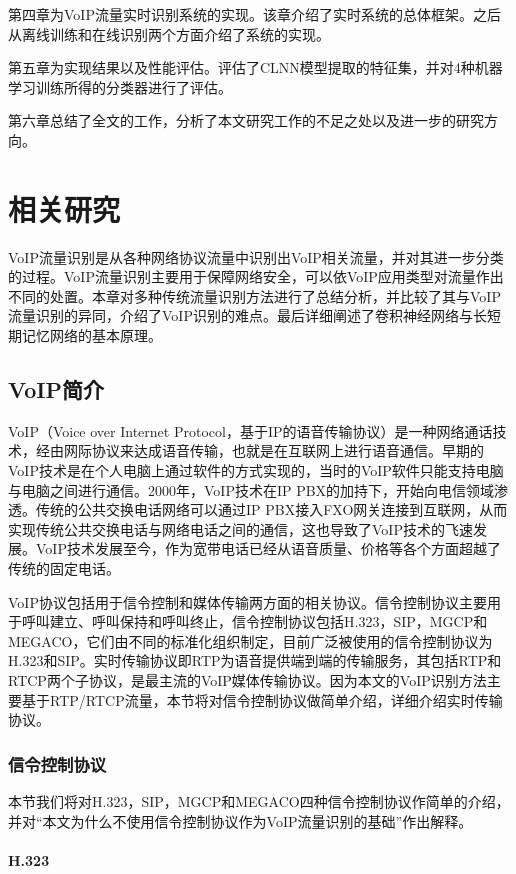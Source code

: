 第四章为VoIP流量实时识别系统的实现。该章介绍了实时系统的总体框架。之后从离线训练和在线识别两个方面介绍了系统的实现。

第五章为实现结果以及性能评估。评估了CLNN模型提取的特征集，并对4种机器学习训练所得的分类器进行了评估。

第六章总结了全文的工作，分析了本文研究工作的不足之处以及进一步的研究方向。


\chapter{相关研究}
VoIP流量识别是从各种网络协议流量中识别出VoIP相关流量，并对其进一步分类的过程。VoIP流量识别主要用于保障网络安全，可以依VoIP应用类型对流量作出不同的处置。本章对多种传统流量识别方法进行了总结分析，并比较了其与VoIP流量识别的异同，介绍了VoIP识别的难点。最后详细阐述了卷积神经网络与长短期记忆网络的基本原理。

\section{VoIP简介}
VoIP（Voice over Internet Protocol，基于IP的语音传输协议）是一种网络通话技术，经由网际协议来达成语音传输，也就是在互联网上进行语音通信。早期的VoIP技术是在个人电脑上通过软件的方式实现的，当时的VoIP软件只能支持电脑与电脑之间进行通信。2000年，VoIP技术在IP PBX的加持下，开始向电信领域渗透。传统的公共交换电话网络可以通过IP PBX接入FXO网关连接到互联网，从而实现传统公共交换电话与网络电话之间的通信，这也导致了VoIP技术的飞速发展。VoIP技术发展至今，作为宽带电话已经从语音质量、价格等各个方面超越了传统的固定电话。

VoIP协议包括用于信令控制和媒体传输两方面的相关协议。信令控制协议主要用于呼叫建立、呼叫保持和呼叫终止，信令控制协议包括H.323，SIP，MGCP和MEGACO，它们由不同的标准化组织制定，目前广泛被使用的信令控制协议为H.323和SIP。实时传输协议即RTP为语音提供端到端的传输服务，其包括RTP和RTCP两个子协议，是最主流的VoIP媒体传输协议。因为本文的VoIP识别方法主要基于RTP/RTCP流量，本节将对信令控制协议做简单介绍，详细介绍实时传输协议。

\subsection{信令控制协议}
本节我们将对H.323，SIP，MGCP和MEGACO四种信令控制协议作简单的介绍，并对“本文为什么不使用信令控制协议作为VoIP流量识别的基础”作出解释。
\subsubsection{H.323}


